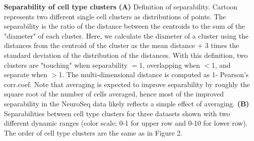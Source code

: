 \textbf{Separability of cell type clusters}
\textbf{(A)} Definition of separability. Cartoon represents two different single cell clusters as distributions of points. The separability is the ratio of the distance between the centroids to the sum of the "diameter" of each cluster. Here, we calculate the diameter of a cluster using the distances from the centroid of the cluster as the mean distance $+$ 3 times the standard deviation of the distribution of the distances. With this definition, two clusters are "touching" when separability $=$1, overlapping when $<$1, and separate when $>$1. The multi-dimensional distance is computed as 1- Pearson's corr.coef. Note that averaging is expected to improve separability by roughly the square root of the number of cells averaged, hence most of the improved separability in the NeuroSeq data likely reflects a simple effect of averaging. 
\textbf{(B)} Separabilities between cell type clusters for three datasets shown with two different dynamic ranges (color scale; 0-1 for upper row and 0-10 for lower row).  The order of cell type clusters are the same as in Figure 2.